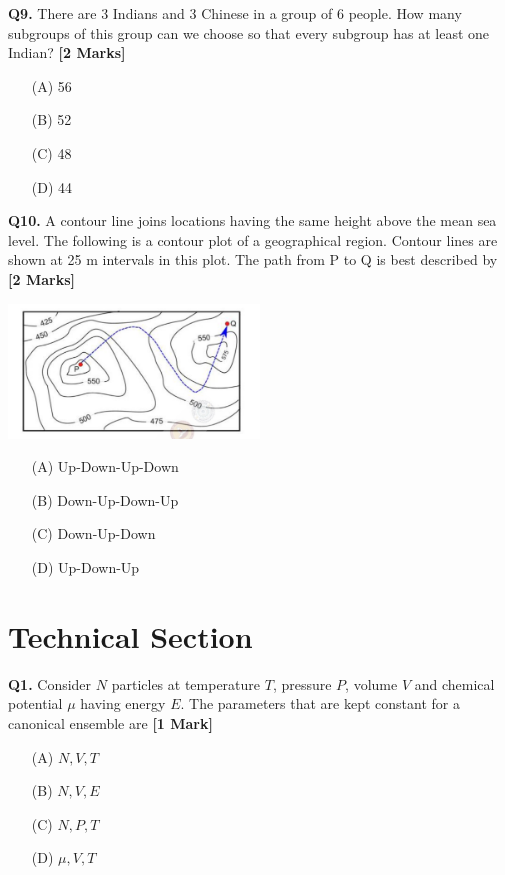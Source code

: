 \documentclass[11pt]{article}
\newcommand{\questiona}[2]{
    \noindent\textbf{Q#2.} #1 \hfill \textbf{[1 Mark]}
}
\newcommand{\questionb}[2]{
    \noindent\textbf{Q#2.} #1 \hfill \textbf{[2 Marks]}
}
\begin{document}
\questionb{There are 3 Indians and 3 Chinese in a group of 6 people. How many subgroups of this group can we choose so that every subgroup has at least one Indian?}{9}
\begin{enumerate}
    \item[(A)] 56  
    \item[(B)] 52  
    \item[(C)] 48  
    \item[(D)] 44  
\end{enumerate}
\vspace{0.5cm}

\questionb{A contour line joins locations having the same height above the mean sea level. The following is a contour plot of a geographical region. Contour lines are shown at 25 m intervals in this plot. The path from P to Q is best described by}{10}
\begin{center}
\includegraphics[width=0.5\textwidth]{figures/10.png}
\end{center}
\begin{enumerate}
    \item[(A)] Up-Down-Up-Down  
    \item[(B)] Down-Up-Down-Up  
    \item[(C)] Down-Up-Down  
    \item[(D)] Up-Down-Up  
\end{enumerate}
\vspace{0.5cm}

\section*{Technical Section}

\questiona{Consider \( N \) particles at temperature \( T \), pressure \( P \), volume \( V \) and chemical potential \( \mu \) having energy \( E \). The parameters that are kept constant for a canonical ensemble are}{1}
\begin{enumerate}
    \item[(A)] \( N, V, T \)
    \item[(B)] \( N, V, E \)
    \item[(C)] \( N, P, T \)
    \item[(D)] \( \mu, V, T \)
\end{enumerate}
\vspace{0.5cm}
\end{document}

